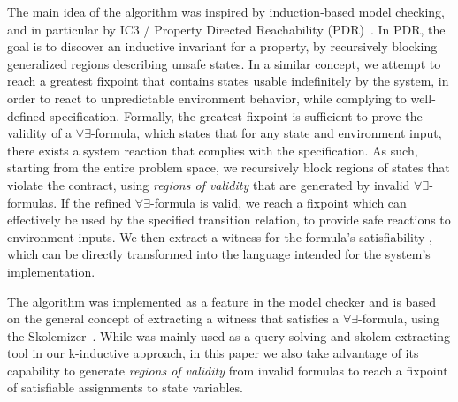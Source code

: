 The main idea of the algorithm was inspired by induction-based model checking, and in particular by IC3 / Property Directed Reachability (PDR)~\cite{bradley2011sat,een2011efficient}. In PDR, the goal is to discover an inductive invariant for a property, by recursively blocking generalized regions describing unsafe states. In a similar concept, we attempt
to reach a greatest fixpoint that contains states usable indefinitely by the
system, in order to react to unpredictable environment behavior, while
complying to well-defined specification. Formally, the greatest fixpoint is sufficient to prove the validity of a $\forall\exists$-formula, which states that for any state and environment input, there exists a system reaction that complies with the specification. As such, starting from the entire
problem space, we recursively block regions of states that violate the contract, using \textit{regions of validity} that are
generated by invalid $\forall\exists$-formulas. 
If the refined
$\forall\exists$-formula is valid, we reach a fixpoint which can effectively be used by the specified transition relation, to
provide safe reactions to environment inputs. We then extract a witness for the
formula's satisfiability%
, which can be directly transformed into the
language intended for the system's implementation.

The algorithm was implemented as a feature in the \jkind model checker and is based on the general
concept of extracting a witness that satisfies a $\forall\exists$-formula, using
the \aeval Skolemizer~\cite{fedyukovich2015automated,KatisFGBGW16}. While \aeval was mainly used as a query-solving and skolem-extracting tool in our k-inductive approach, in this paper we also take advantage of its capability to generate
\textit{regions of validity} from invalid formulas to reach a fixpoint of satisfiable assignments to state variables.

